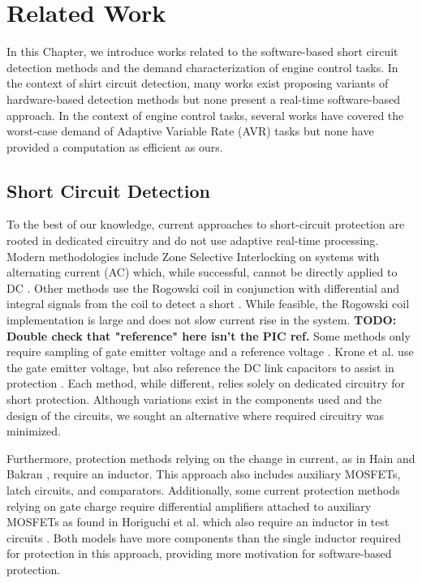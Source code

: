 \section{Related Work}   \label{chap:relatedWork}

In this Chapter, we introduce works related to the software-based short circuit detection methods and the demand characterization of engine control tasks.
In the context of shirt circuit detection, many works exist proposing variants of hardware-based detection methods but none present a real-time software-based approach.
In the context of engine control tasks, several works have covered the worst-case demand of Adaptive Variable Rate (AVR) tasks but none have provided a computation as efficient as ours.

\subsection{Short Circuit Detection} \label{subsec:scd-relatedWork}

To the best of our knowledge, current approaches to short-circuit protection are rooted in dedicated circuitry and do not use adaptive real-time processing.
Modern methodologies include Zone Selective Interlocking on systems with alternating current (AC) which, while successful, cannot be directly applied to DC \cite{du_new_2014}.
Other methods use the Rogowski coil in conjunction with differential and integral signals from the coil to detect a short \cite{wang_new_2011}.
While feasible, the Rogowski coil implementation is large and does not slow current rise in the system.
\textbf{TODO: Double check that "reference" here isn't the PIC ref.} Some methods only require sampling of gate emitter voltage and a reference voltage \cite{horiguchi_short_2014}.
Krone et al. use the gate emitter voltage, but also reference the DC link capacitors to assist in protection \cite{krone_fast_2015}.
Each method, while different, relies solely on dedicated circuitry for short protection.
Although variations exist in the components used and the design of the circuits, we sought an alternative where required circuitry was minimized.

Furthermore, protection methods relying on the change in current, as in Hain and Bakran \cite{hain_new_2016}, require an inductor.
This approach also includes auxiliary MOSFETs, latch circuits, and comparators.
Additionally, some current protection methods relying on gate charge require differential amplifiers attached to auxiliary MOSFETs as found in Horiguchi et al. which also require an inductor in test circuits \cite{horiguchi_high-speed_2015}.
Both models have more components than the single inductor required for protection in this approach, providing more motivation for software-based protection.

